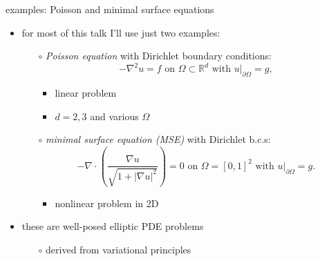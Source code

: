 \documentclass[hide notes,intlimits,usenames,dvipsnames]{beamer}
\newcommand{\RR}{\mathbb{R}}
\newcommand{\grad}{\nabla}
\begin{document}
\begin{frame}{examples: Poisson and minimal surface equations}

\begin{itemize}
\item for most of this talk I'll use just two examples:
	\begin{itemize}

    \bigskip
	\item[$\circ$] \emph{Poisson equation} with Dirichlet boundary conditions:
	    $$- \grad^2 u = f \text{ on } \Omega \subset \RR^d \text{ with } u\big|_{\partial \Omega} = g,$$
	    \vspace{-5mm}
		\begin{itemize}
		\item linear problem
		\item $d=2,3$ and various $\Omega$
		\end{itemize}

    \bigskip
	\item[$\circ$] \emph{minimal surface equation (MSE)} with Dirichlet b.c.s:
	    $$- \grad\cdot \left(\frac{\grad u}{\sqrt{1 + |\grad u|^2}}\right) = 0  \text{ on } \Omega = [0,1]^2 \text{ with } u\big|_{\partial \Omega} = g.$$
	    \vspace{-2mm}
		\begin{itemize}
		\item nonlinear problem in 2D
		\end{itemize}
	\end{itemize}

\medskip
\item these are well-posed elliptic PDE problems
	\begin{itemize}
	\item[$\circ$] derived from variational principles
	\end{itemize}
\end{itemize}
\end{frame}
\end{document}
